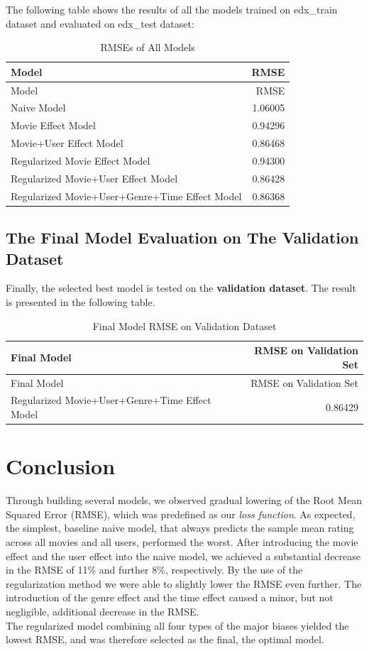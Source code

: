 \documentclass[
]{article}
\begin{document}
The following table shows the results of all the models trained on
edx\_train dataset and evaluated on edx\_test dataset:

\begin{longtable}[]{@{}lr@{}}
\caption{RMSEs of All Models}\tabularnewline
\toprule
Model & RMSE\tabularnewline
\midrule
\endfirsthead
\toprule
Model & RMSE\tabularnewline
\midrule
\endhead
Naive Model & 1.06005\tabularnewline
Movie Effect Model & 0.94296\tabularnewline
Movie+User Effect Model & 0.86468\tabularnewline
Regularized Movie Effect Model & 0.94300\tabularnewline
Regularized Movie+User Effect Model & 0.86428\tabularnewline
Regularized Movie+User+Genre+Time Effect Model & 0.86368\tabularnewline
\bottomrule
\end{longtable}

\hypertarget{the-final-model-evaluation-on-the-validation-dataset}{%
\subsection{The Final Model Evaluation on The Validation
Dataset}\label{the-final-model-evaluation-on-the-validation-dataset}}

Finally, the selected best model is tested on the \textbf{validation
dataset}. The result is presented in the following table.

\begin{longtable}[]{@{}lr@{}}
\caption{Final Model RMSE on Validation Dataset}\tabularnewline
\toprule
Final Model & RMSE on Validation Set\tabularnewline
\midrule
\endfirsthead
\toprule
Final Model & RMSE on Validation Set\tabularnewline
\midrule
\endhead
Regularized Movie+User+Genre+Time Effect Model & 0.86429\tabularnewline
\bottomrule
\end{longtable}

\newpage

\hypertarget{conclusion}{%
\section{Conclusion}\label{conclusion}}

Through building several models, we observed gradual lowering of the
Root Mean Squared Error (RMSE), which was predefined as our \emph{loss
function}. As expected, the simplest, baseline naive model, that always
predicts the sample mean rating across all movies and all users,
performed the worst. After introducing the movie effect and the user
effect into the naive model, we achieved a substantial decrease in the
RMSE of 11\% and further 8\%, respectively. By the use of the
regularization method we were able to slightly lower the RMSE even
further. The introduction of the genre effect and the time effect caused
a minor, but not negligible, additional decrease in the RMSE.\\
The regularized model combining all four types of the major biases
yielded the lowest RMSE, and was therefore selected as the final, the
optimal model.
\end{document}
